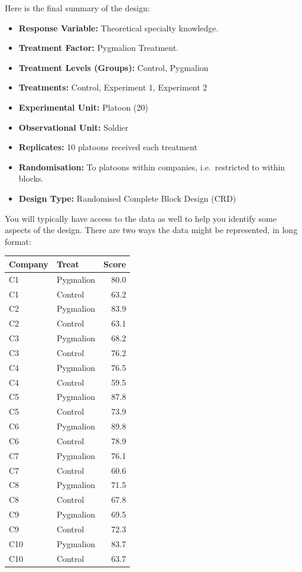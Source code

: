 \documentclass[
  letterpaper,
]{book}
\providecommand{\tightlist}{%
  \setlength{\itemsep}{0pt}\setlength{\parskip}{0pt}}\usepackage{longtable,booktabs,array}
\begin{document}
Here is the final summary of the design:

\begin{itemize}
\tightlist
\item
  \textbf{Response Variable:} Theoretical specialty knowledge.
\item
  \textbf{Treatment Factor:} Pygmalion Treatment.
\item
  \textbf{Treatment Levels (Groups):} Control, Pygmalion
\item
  \textbf{Treatments:} Control, Experiment 1, Experiment 2\\
\item
  \textbf{Experimental Unit:} Platoon (20)\\
\item
  \textbf{Observational Unit:} Soldier\\
\item
  \textbf{Replicates:} 10 platoons received each treatment\\
\item
  \textbf{Randomisation:} To platoons within companies, i.e.~restricted
  to within blocks.
\item
  \textbf{Design Type:} Randomised Complete Block Design (CRD)
\end{itemize}

You will typically have access to the data as well to help you identify
some aspects of the design. There are two ways the data might be
represented, in long format:

\begin{longtable*}[t]{llr}
\toprule
Company & Treat & Score\\
\midrule
C1 & Pygmalion & 80.0\\
C1 & Control & 63.2\\
C2 & Pygmalion & 83.9\\
C2 & Control & 63.1\\
C3 & Pygmalion & 68.2\\
\addlinespace
C3 & Control & 76.2\\
C4 & Pygmalion & 76.5\\
C4 & Control & 59.5\\
C5 & Pygmalion & 87.8\\
C5 & Control & 73.9\\
\addlinespace
C6 & Pygmalion & 89.8\\
C6 & Control & 78.9\\
C7 & Pygmalion & 76.1\\
C7 & Control & 60.6\\
C8 & Pygmalion & 71.5\\
\addlinespace
C8 & Control & 67.8\\
C9 & Pygmalion & 69.5\\
C9 & Control & 72.3\\
C10 & Pygmalion & 83.7\\
C10 & Control & 63.7\\
\bottomrule
\end{longtable*}
\end{document}

